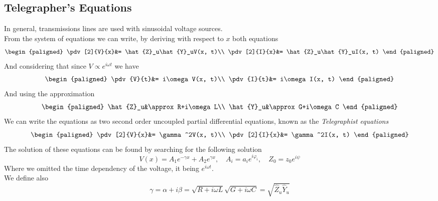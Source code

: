 \documentclass[../electromagnetism.tex]{subfiles}
\begin{document}
\subsection{Telegrapher's Equations}
In general, transmissions lines are used with sinusoidal voltage sources.\\
From the system of equations we can write, by deriving with respect to $x$ both equations
\begin{equation*}
	\begin{paligned}
		\pdv[2]{V}{x}&= \hat{Z}_u\hat{Y}_uV(x, t)\\
		\pdv[2]{I}{x}&= \hat{Z}_u\hat{Y}_uI(x, t)
	\end{paligned}
\end{equation*}
And considering that since $V\propto e^{i\omega t}$ we have 
\begin{equation*}
	\begin{paligned}
		\pdv{V}{t}&= i\omega V(x, t)\\
		\pdv{I}{t}&= i\omega I(x, t)
	\end{paligned}
\end{equation*}
And using the approximation 
\begin{equation*}
	\begin{paligned}
		\hat{Z}_u&\approx R+i\omega L\\
		\hat{Y}_u&\approx G+i\omega C
	\end{paligned}
\end{equation*}
We can write the equations as two second order uncoupled partial differential equations, known as the \textit{Telegraphist equations}
\begin{equation}
	\begin{paligned}
		\pdv[2]{V}{x}&= \gamma^2V(x, t)\\
		\pdv[2]{I}{x}&= \gamma^2I(x, t)
	\end{paligned}
	\label{eq:telegraphist.tra}
\end{equation}
The solution of these equations can be found by searching for the following solution
\begin{equation*}
	V(x)=A_1e^{-\gamma x}+A_2e^{\gamma x}, \quad A_i=a_ie^{i\varphi_i}, \quad Z_0=z_0e^{i\psi}
\end{equation*}
Where we omitted the time dependency of the voltage, it being $e^{i\omega t}$.\\
We define also
\begin{equation*}
	\gamma=\alpha+i\beta=\sqrt{R+i\omega L}\sqrt{G+i\omega C}=\sqrt{\hat{Z}_u\hat{Y}_u}
\end{equation*}
\end{document}

